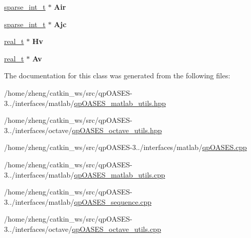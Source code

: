 \begin{DoxyCompactItemize}
\item 
\mbox{\label{class_q_p_instance_a3af4c67d31cca6813a405c71497da242}} 
\hyperlink{_types_8hpp_aa5432b00c9081e2d62d7f38c32e4ed80}{sparse\+\_\+int\+\_\+t} $\ast$ {\bfseries Air}
\item 
\mbox{\label{class_q_p_instance_adc49949c0cb88e280a7999518162aacd}} 
\hyperlink{_types_8hpp_aa5432b00c9081e2d62d7f38c32e4ed80}{sparse\+\_\+int\+\_\+t} $\ast$ {\bfseries Ajc}
\item 
\mbox{\label{class_q_p_instance_a5cb5590094585f8ba51a5b6ddad44888}} 
\hyperlink{qp_o_a_s_e_s__wrapper_8h_a0d00e2b3dfadee81331bbb39068570c4}{real\+\_\+t} $\ast$ {\bfseries Hv}
\item 
\mbox{\label{class_q_p_instance_a84fd77e40c9047316bf7cd70659ce68e}} 
\hyperlink{qp_o_a_s_e_s__wrapper_8h_a0d00e2b3dfadee81331bbb39068570c4}{real\+\_\+t} $\ast$ {\bfseries Av}
\end{DoxyCompactItemize}


The documentation for this class was generated from the following files\+:\begin{DoxyCompactItemize}
\item 
/home/zheng/catkin\+\_\+ws/src/qp\+O\+A\+S\+E\+S-\/3../interfaces/matlab/\hyperlink{qp_o_a_s_e_s__matlab__utils_8hpp}{qp\+O\+A\+S\+E\+S\+\_\+matlab\+\_\+utils.\+hpp}\item 
/home/zheng/catkin\+\_\+ws/src/qp\+O\+A\+S\+E\+S-\/3../interfaces/octave/\hyperlink{qp_o_a_s_e_s__octave__utils_8hpp}{qp\+O\+A\+S\+E\+S\+\_\+octave\+\_\+utils.\+hpp}\item 
/home/zheng/catkin\+\_\+ws/src/qp\+O\+A\+S\+E\+S-\/3../interfaces/matlab/\hyperlink{matlab_2qp_o_a_s_e_s_8cpp}{qp\+O\+A\+S\+E\+S.\+cpp}\item 
/home/zheng/catkin\+\_\+ws/src/qp\+O\+A\+S\+E\+S-\/3../interfaces/matlab/\hyperlink{qp_o_a_s_e_s__matlab__utils_8cpp}{qp\+O\+A\+S\+E\+S\+\_\+matlab\+\_\+utils.\+cpp}\item 
/home/zheng/catkin\+\_\+ws/src/qp\+O\+A\+S\+E\+S-\/3../interfaces/matlab/\hyperlink{matlab_2qp_o_a_s_e_s__sequence_8cpp}{qp\+O\+A\+S\+E\+S\+\_\+sequence.\+cpp}\item 
/home/zheng/catkin\+\_\+ws/src/qp\+O\+A\+S\+E\+S-\/3../interfaces/octave/\hyperlink{qp_o_a_s_e_s__octave__utils_8cpp}{qp\+O\+A\+S\+E\+S\+\_\+octave\+\_\+utils.\+cpp}\end{DoxyCompactItemize}
